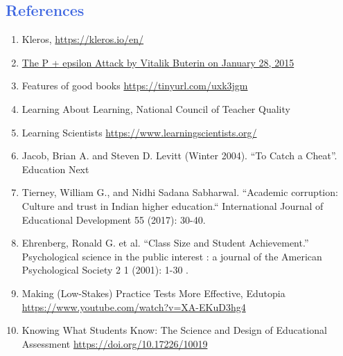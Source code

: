 \documentclass[a4paper,12pt,twoside]{extarticle}
\begin{document}
\begin{adjustwidth}{11em}{}
\section*{\textcolor{RoyalBlue}{References}}
\begin{scriptsize}
\begin{enumerate} 
\item Kleros, \href{https://kleros.io/en/}{https://kleros.io/en/}
\item \href{https://blog.ethereum.org/2015/01/28/p-epsilon-attack/}{The P + epsilon Attack by Vitalik Buterin on January 28, 2015} 
\item Features of good books \href{https://tinyurl.com/uxk3jgm}{https://tinyurl.com/uxk3jgm}
\item Learning About Learning, National Council of Teacher Quality
\item Learning Scientists \href{https://www.learningscientists.org/}{https://www.learningscientists.org/}
\item Jacob, Brian A. and Steven D. Levitt (Winter 2004). “To Catch a Cheat”. Education Next
\item Tierney, William G., and Nidhi Sadana Sabharwal. “Academic corruption: Culture and trust in Indian higher education.“ International Journal of Educational Development 55 (2017): 30-40.
\item Ehrenberg, Ronald G. et al. “Class Size and Student Achievement.” Psychological science in the public interest : a journal of the American Psychological Society 2 1 (2001): 1-30 .
\item Making (Low-Stakes) Practice Tests More Effective, Edutopia \href{https://www.youtube.com/watch?v=XA-EKuD3hg4}{https://www.youtube.com/watch?v=XA-EKuD3hg4}
\item Knowing What Students Know: The Science and Design of Educational Assessment \href{https://doi.org/10.17226/10019}{https://doi.org/10.17226/10019}

\end{enumerate}

\end{scriptsize}


\end{adjustwidth}
\end{document}
